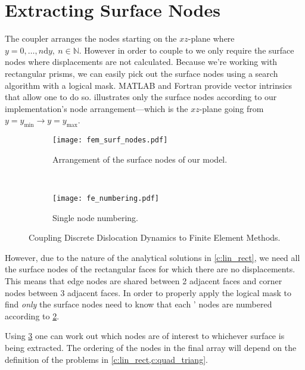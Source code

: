 	\section{Extracting Surface Nodes}
		The  coupler arranges the nodes starting on the $ xz $-plane where $ y = 0, \ldots, n \mathrm{d}y,~n\in \mathbb{N} $. However in order to couple  to  we only require the surface nodes where displacements are not calculated. Because we're working with rectangular prisms, we can easily pick out the surface nodes using a search algorithm with a logical mask. MATLAB and Fortran provide vector intrinsics that allow one to do so.  illustrates only the surface nodes according to our implementation's node arrangement---which is the $ xz $-plane going from $ y = y_{\textrm{min}} \to y = y_{\textrm{max}} $.
		\begin{figure}
			\centering
			\begin{subfigure}[b]{0.45\linewidth}
				\centering
				\texttt{[image: fem\_surf\_nodes.pdf]}
				\caption[Surface nodes of our  model.]{Arrangement of the surface nodes of our  model.}
				\label{f:fem_surf_nodes}
			\end{subfigure}
			~
			\begin{subfigure}[b]{0.45\linewidth}
				\centering
				\texttt{[image: fe\_numbering.pdf]}
				\caption[Single finite element node numbering.]{Single  node numbering.}
				\label{f:fe_numbering}
			\end{subfigure}
		\caption[Coupling Discrete Dislocation Dynamics to Finite Element Methods.]{Coupling Discrete Dislocation Dynamics to Finite Element Methods.}
		\label{f:fem_node_arr}
		\end{figure}
		However, due to the nature of the analytical solutions in \cref{c:lin_rect}, we need all the surface nodes of the rectangular faces for which there are no displacements. This means that edge nodes are shared between 2 adjacent faces and corner nodes between 3 adjacent faces. In order to properly apply the logical mask to find \emph{only} the surface nodes need to know that each ' nodes are numbered according to \cref{f:fe_numbering}.
		
		Using \cref{f:fem_node_arr} one can work out which nodes are of interest to whichever surface is being extracted. The ordering of the nodes in the final array will depend on the definition of the problems in \cref{c:lin_rect,c:quad_triang}.
		
